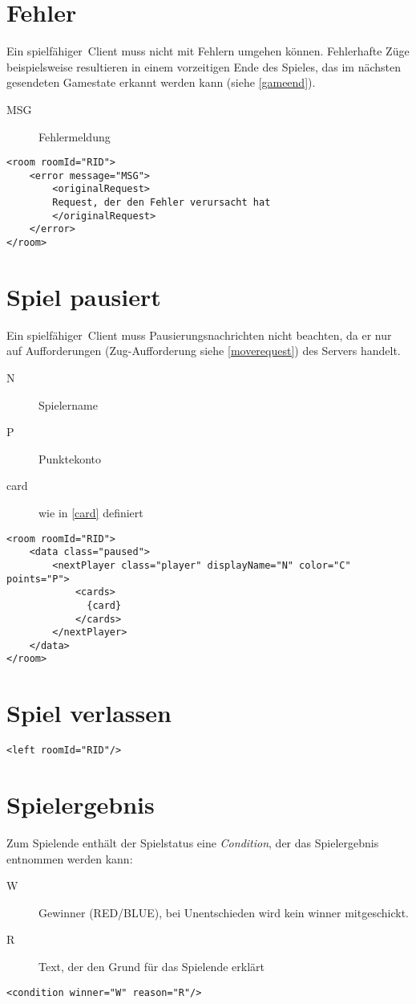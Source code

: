\documentclass[12pt,a4paper, ngerman, oneside]{scrartcl}
\begin{document}
\section{Fehler}
Ein \glqq spielfähiger\grqq\ Client muss nicht mit Fehlern umgehen können.
Fehlerhafte Züge beispielsweise resultieren in einem vorzeitigen Ende des
Spieles, das im nächsten gesendeten Gamestate erkannt werden kann (siehe \ref{gameend}).
\begin{description}
\item[MSG] Fehlermeldung
\end{description}
\begin{verbatim}
<room roomId="RID">
	<error message="MSG">
		<originalRequest>
		Request, der den Fehler verursacht hat
		</originalRequest>
	</error>
</room>
\end{verbatim}

\section{Spiel pausiert}
Ein \glqq spielfähiger\grqq\ Client muss Pausierungsnachrichten nicht beachten,
da er nur auf Aufforderungen (Zug-Aufforderung siehe \ref{moverequest}) des Servers handelt.
\begin{description}
\item[N] Spielername
\item[P] Punktekonto
\item[card] wie in \ref{card} definiert
\end{description}
\begin{verbatim}
<room roomId="RID">
	<data class="paused">
		<nextPlayer class="player" displayName="N" color="C" points="P">
			<cards>
			  {card}
			</cards>
		</nextPlayer>
	</data>
</room>
\end{verbatim}

\section{Spiel verlassen}
\begin{verbatim}
<left roomId="RID"/>
\end{verbatim}


\section{\label{gameend}Spielergebnis}
Zum Spielende enthält der Spielstatus eine \textit{Condition}, der das Spielergebnis entnommen werden kann:
\begin{description}
\item[W] Gewinner (RED/BLUE), bei Unentschieden wird kein winner mitgeschickt.
\item[R] Text, der den Grund für das Spielende erklärt
\end{description}
\begin{verbatim}
<condition winner="W" reason="R"/>
\end{verbatim}
\end{document}
